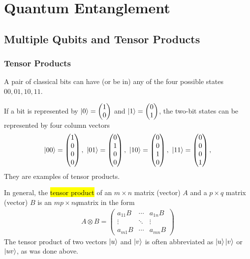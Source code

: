 \newpage
\section{Quantum Entanglement}


\subsection{Multiple Qubits and Tensor Products}

\subsubsection{Tensor Products}
A pair of classical bits can have (or be in) any of the four possible states $00, 01, 10, 11$. 

If a bit is represented by $\ket{0}=\begin{pmatrix}
    1 \\0
\end{pmatrix}$ and $\ket{1}=\begin{pmatrix}
    0\\1
\end{pmatrix}$, the two-bit states can be represented by four column vectors
\begin{align*}
    \ket{00}=\begin{pmatrix}
        1\\0\\0\\0
    \end{pmatrix},\ 
    \ket{01}=\begin{pmatrix}
        0\\1\\0\\0
    \end{pmatrix}, \ 
    \ket{10}=\begin{pmatrix}
        0\\0\\1\\0
    \end{pmatrix},\ 
    \ket{11}=\begin{pmatrix}
        0\\0\\0\\1 
    \end{pmatrix},
\end{align*}
They are examples of tensor products. 

In general, the \hl{tensor product} of an $m\times n$ matrix (vector) $A$ and a $p \times q$ matrix (vector) $B$ is an $mp \times nq$matrix in the form
\begin{align*}
    A\otimes B=\begin{pmatrix}
        a_{11}B & \cdots & a_{1n}B\\
        \vdots & \ddots & \vdots\\
        a_{m1}B & \cdots & a_{mn}B
    \end{pmatrix}
\end{align*}
The tensor product of two vectors $\ket{u}$ and $\ket{v}$ is often abbreviated as $\ket{u}\ket{v}$ or $\ket{uv}$, as was done above.

